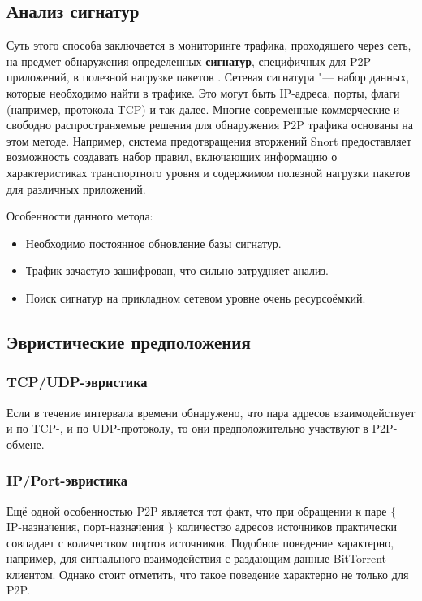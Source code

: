 \documentclass[bachelor, och, coursework]{SCWorks}
\begin{document}
\subsection{Анализ сигнатур}
Суть этого способа заключается в мониторинге трафика, проходящего через сеть, 
на предмет обнаружения определенных \textbf{сигнатур}, специфичных для P2P-приложений, в полезной нагрузке пакетов \cite{seclab}.
Сетевая сигнатура "--- набор данных, которые необходимо найти в трафике. Это могут быть IP-адреса, порты, флаги (например, протокола TCP) и так далее. Многие современные коммерческие и свободно распространяемые решения для обнаружения P2P трафика основаны на этом методе. Например, система предотвращения вторжений Snort предоставляет возможность создавать набор правил, включающих информацию о характеристиках транспортного уровня и содержимом полезной нагрузки пакетов для различных приложений. 

Особенности данного метода:
\begin{itemize}
    \item Необходимо постоянное обновление базы сигнатур.
    \item Трафик зачастую зашифрован, что сильно затрудняет анализ.
    \item Поиск сигнатур на прикладном сетевом уровне очень ресурсоёмкий.
\end{itemize}

\subsection{Эвристические предположения}

\subsubsection{TCP/UDP-эвристика}
Если в течение интервала времени обнаружено, что пара адресов взаимодействует и по TCP-, и по UDP-протоколу, то они
предположительно участвуют в P2P-обмене.

\subsubsection{IP/Port-эвристика}
Ещё одной особенностью P2P является тот факт, что при обращении к паре $\{$ IP-назначения, порт-назначения $\}$
количество адресов источников практически совпадает с количеством портов источников. Подобное поведение
характерно, например, для сигнального взаимодействия с раздающим данные BitTorrent-клиентом. Однако стоит отметить,
что такое поведение характерно не только для P2P.
\end{document}

